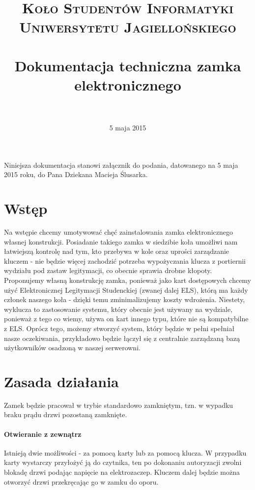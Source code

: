 \documentclass[paper=a4, fontsize=11pt]{scrartcl} %
\title{	
\normalfont \normalsize 
\textsc{Koło Studentów Informatyki Uniwersytetu Jagiellońskiego} \\ [25pt] %
\horrule{0.5pt} \\[0.4cm] %
\huge Dokumentacja techniczna zamka elektronicznego \\ %
\horrule{2pt} \\[0.5cm] %
}
\author{} %
\date{\normalsize5 maja 2015} %
\numberwithin{equation}{section} %
\numberwithin{figure}{section} %
\numberwithin{table}{section} %
\begin{document}
\maketitle

Niniejsza dokumentacja stanowi załącznik do podania, datowanego na 5 maja 2015 roku, do Pana Dziekana Macieja Ślusarka.

\section{Wstęp}

Na wstępie chcemy umotywować chęć zainstalowania zamka elektronicznego własnej konstrukcji. Posiadanie takiego zamka w siedzibie koła
umożliwi nam łatwiejszą kontrolę nad tym, kto przebywa w kole oraz uprości zarządzanie kluczem - nie będzie więcej zachodzić potrzeba
wypożyczania klucza z portiernii wydziału pod zastaw legitymacji, co obecnie sprawia drobne kłopoty. Proponujemy własną
konstrukcję zamka, ponieważ jako kart dostępowych chcemy użyć Elektronicznej Legitymacji Studenckiej (zwanej dalej ELS), którą ma każdy
członek naszego koła - dzięki temu zminimalizujemy koszty wdrożenia. Niestety, wyklucza to zastosowanie systemu, który obecnie jest używany
na wydziale, ponieważ z tego co wiemy, używa on kart innego typu, które nie są kompatybilne z ELS. Oprócz tego, możemy stworzyć system,
który będzie w pełni spełniał nasze oczekiwania, przykładowo będzie łączył się z centralnie zarządzaną bazą użytkowników osadzoną w naszej
serwerowni.


\section{Zasada działania}

Zamek będzie pracował w trybie standardowo zamkniętym, tzn. w wypadku braku prądu drzwi pozostaną zamknięte.

\paragraph{Otwieranie z zewnątrz}

Istnieją dwie możliwości - za pomocą karty lub za pomocą klucza. W przypadku karty wystarczy przyłożyć ją do czytnika, ten po dokonaniu
autoryzacji zwolni blokadę drzwi podając napięcie na elektrozaczep. Kluczem dalej będzie można otworzyć drzwi przekręcając go w zamku do
oporu.
\end{document}
